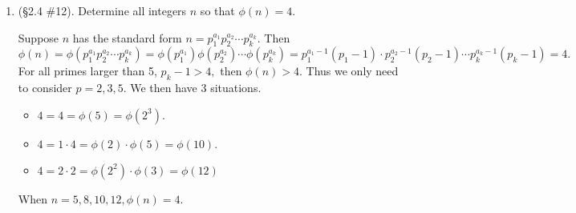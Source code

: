\documentclass[11pt,a4paper]{article}
\begin{document}
\begin{enumerate}
	\item (\S 2.4 \#12). Determine all integers \(n\) so that \(\phi(n)=4\).

	Suppose $n$ has the standard form $n = p_1^{a_1}p_2^{a_2}\cdots p_k^{a_k}.$ Then \(\phi(n)=\phi(p_1^{a_1}p_2^{a_2}\cdots p_k^{a_k}) = \phi(p_1^{a_1})\phi(p_2^{a_2})\cdots \phi(p_k^{a_k}) = p_1^{a_1-1}(p_1-1)\cdot p_2^{a_2-1}(p_2-1)\cdots p_k^{a_k-1}(p_k-1)=4.\) For all primes larger than 5, $p_k - 1 > 4,$ then $\phi(n)>4$. Thus we only need to consider $p = 2, 3, 5.$ We then have 3 situations.

	\begin{itemize}
		\item $4=4=\phi(5) = \phi(2^3).$
		\item $4=1\cdot 4 = \phi(2)\cdot \phi(5) = \phi(10).$
		\item $4=2\cdot 2 = \phi(2^2) \cdot \phi(3) = \phi(12)$
	\end{itemize}

	When $n = 5,8, 10, 12, \phi(n)=4.$

\end{enumerate}
\end{document}
